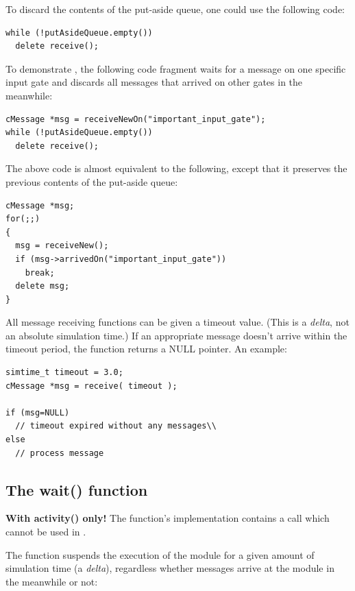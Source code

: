To discard the contents of the put-aside queue, one could use 
the following code:

\begin{Verbatim}
while (!putAsideQueue.empty())
  delete receive();
\end{Verbatim}


To demonstrate , the following code fragment waits 
for a message on one specific input gate and discards all messages 
that arrived on other gates in the meanwhile:

\begin{Verbatim}
cMessage *msg = receiveNewOn("important_input_gate");
while (!putAsideQueue.empty())
  delete receive();
\end{Verbatim}


The above code is almost equivalent to the following, except 
that it preserves the previous contents of the put-aside queue:

\begin{Verbatim}
cMessage *msg;
for(;;) 
{
  msg = receiveNew(); 
  if (msg->arrivedOn("important_input_gate")) 
    break;
  delete msg;
}
\end{Verbatim}


All message receiving functions can be given a timeout
value. (This is a \textit{delta}, not an
absolute simulation time.) If an appropriate message doesn't arrive
within the timeout period, the function returns a NULL pointer. An
example:

\begin{Verbatim}
simtime_t timeout = 3.0;
cMessage *msg = receive( timeout );

if (msg=NULL)
  // timeout expired without any messages\\
else
  // process message
\end{Verbatim}



\subsection{The wait() function}

\textbf{With activity() only!} The  function's implementation 
contains a  call which cannot be used in .

The  function suspends the execution of the module for 
a given amount of simulation time (a \textit{delta}), regardless whether 
messages arrive at the module in the meanwhile or not:

